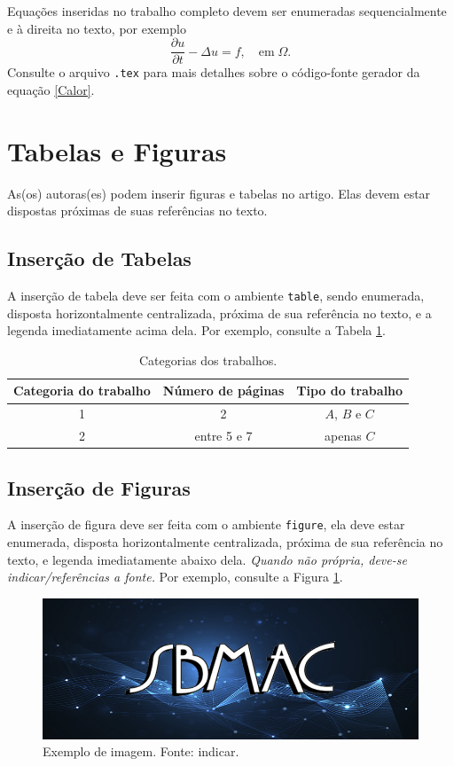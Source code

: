 \documentclass{pssbmac}
\begin{document}
Equações inseridas no trabalho completo devem ser enumeradas sequencialmente e à direita no texto, por exemplo
\begin{equation}
\frac{\partial u}{\partial t}-\Delta u = f, \quad  \mathrm{em} \; \Omega. \label{Calor}
\end{equation}
Consulte o arquivo \verb!.tex! para mais detalhes sobre o código-fonte gerador da equação \eqref{Calor}.

\section{Tabelas e Figuras}

As(os) autoras(es) podem inserir figuras e tabelas no artigo. Elas devem estar dispostas próximas de suas referências no texto.

\subsection{Inserção de Tabelas}

A inserção de tabela deve ser feita com o ambiente \verb!table!, sendo enumerada, disposta horizontalmente centralizada, próxima de sua referência no texto, e a legenda imediatamente acima dela. Por exemplo, consulte a Tabela \ref{tabela01}.

\begin{table}[H]
\caption{ {\small Categorias dos trabalhos.}}
\centering
\begin{tabular}{ccc}
\hline
Categoria do trabalho  & Número de páginas & Tipo do trabalho\\ \hline
1          & 2  & $A$, $B$ e $C$    \\
2          & entre 5 e 7  & apenas $C$ \\
\hline
\end{tabular}\label{tabela01}
\end{table}

\subsection{Inserção de Figuras}

A inserção de figura deve ser feita com o ambiente \verb!figure!, ela deve estar enumerada, disposta horizontalmente centralizada, próxima de sua referência no texto, e legenda imediatamente abaixo dela. \emph{Quando não própria, deve-se indicar/referências a fonte.} Por exemplo, consulte a Figura \ref{figura01}.

\begin{figure}[H]
\centering
\includegraphics[width=.7\textwidth]{ex_fig}
\caption{ {\small Exemplo de imagem. Fonte: indicar.}}
\label{figura01}
\end{figure}
\end{document}
